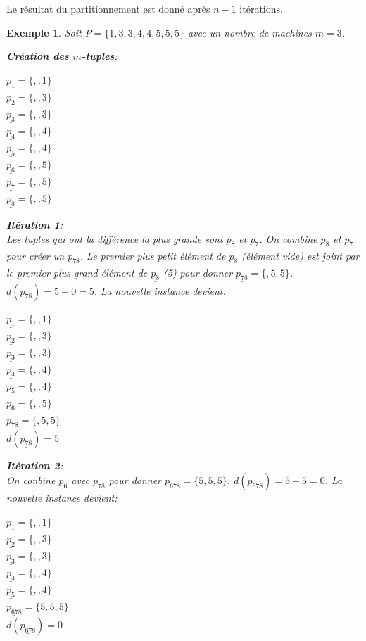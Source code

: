 \documentclass[a4paper,12pt]{report}
\theoremstyle{plain}				%
\newtheorem{example}{Exemple}
\theoremstyle{definition}				%
\begin{document}
\begin{itemize}
Le résultat du partitionnement est donné après $n-1$ itérations.

\begin{example}

Soit $P=\{1,3,3,4,4,5,5,5\}$ avec un nombre de machines $m=3$.

\textbf{Création des $m$-tuples}:
\begin{multicols}{3}
$\underline{p_{1}} = \{,,1\}$\\
$\underline{p_{2}} = \{,,3\}$\\
$\underline{p_{3}} = \{,,3\}$\\
$\underline{p_{4}} = \{,,4\}$\\
$\underline{p_{5}} = \{,,4\}$\\
$\underline{p_{6}} = \{,,5\}$\\
$\underline{p_{7}} = \{,,5\}$\\
$\underline{p_{8}} = \{,,5\}$
\end{multicols}

\textbf{Itération 1}:\\
Les tuples qui ont la différence la plus grande sont
$\underline{p_{8}}$  et $\underline{p_{7}}$.
On combine $\underline{p_{8}}$ et $\underline{p_{7}}$ pour créer un
$\underline{p_{78}}$. Le premier plus petit élément de
$\underline{p_{8}}$ (élément vide) est joint par le premier plus grand
élément de $\underline{p_{8}}$ (5) pour donner $\underline{p_{78}} =
\{,5,5\}$. $d(\underline{p_{78}}) = 5-0 = 5$.
La nouvelle instance devient:
\begin{multicols}{3}
$\underline{p_{1}} = \{,,1\}$\\
$\underline{p_{2}} = \{,,3\}$\\
$\underline{p_{3}} = \{,,3\}$\\
$\underline{p_{4}} = \{,,4\}$\\
$\underline{p_{5}} = \{,,4\}$\\
$\underline{p_{6}} = \{,,5\}$\\
$\underline{p_{78}} = \{,5,5\}$\\
$d(\underline{p_{78}})=5$
\end{multicols}

\textbf{Itération 2}:\\
On conbine $\underline{p_{6}}$ avec $\underline{p_{78}}$ pour donner
$\underline{p_{678}} = \{5,5,5\}$. $d(\underline{p_{678}}) = 5-5 =
0$.
La nouvelle instance devient:
\begin{multicols}{3}
$\underline{p_{1}} = \{,,1\}$\\
$\underline{p_{2}} = \{,,3\}$\\
$\underline{p_{3}} = \{,,3\}$\\
$\underline{p_{4}} = \{,,4\}$\\
$\underline{p_{5}} = \{,,4\}$\\
$\underline{p_{678}} = \{5,5,5\}$\\
$d(\underline{p_{678}}) = 0$
\end{multicols}


\end{example}
\end{itemize}
\end{document}

